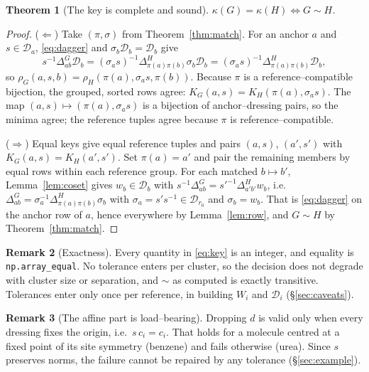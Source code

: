 \documentclass[11pt]{article}
\newtheorem{theorem}{Theorem}
\theoremstyle{definition}
\newtheorem{remark}[theorem]{Remark}
\newcommand{\Dgrp}{\mathcal{D}}
\newcommand{\inv}{^{-1}}
\newcommand{\key}{\kappa}
\begin{document}
\begin{theorem}[The key is complete and sound]\label{thm:key}
$\key(G)=\key(H)\iff G\sim H$.
\end{theorem}

\begin{proof}
($\Leftarrow$) Take $(\pi,\sigma)$ from Theorem~\ref{thm:match}. For an anchor $a$
and $s\in\Dgrp_a$, \eqref{eq:dagger} and $\sigma_b\Dgrp_b=\Dgrp_b$ give
\[
  s\inv\Delta^G_{ab}\Dgrp_b=(\sigma_as)\inv\Delta^H_{\pi(a)\pi(b)}\sigma_b\Dgrp_b
  =(\sigma_as)\inv\Delta^H_{\pi(a)\pi(b)}\Dgrp_b ,
\]
so $\rho_G(a,s,b)=\rho_H(\pi(a),\sigma_as,\pi(b))$. Because $\pi$ is a
reference--compatible bijection, the grouped, sorted rows agree:
$K_G(a,s)=K_H(\pi(a),\sigma_as)$. The map $(a,s)\mapsto(\pi(a),\sigma_as)$ is a
bijection of anchor--dressing pairs, so the minima agree; the reference tuples
agree because $\pi$ is reference--compatible.

($\Rightarrow$) Equal keys give equal reference tuples and pairs $(a,s)$,
$(a',s')$ with $K_G(a,s)=K_H(a',s')$. Set $\pi(a)=a'$ and pair the remaining
members by equal rows within each reference group. For each matched $b\mapsto b'$,
Lemma~\ref{lem:coset} gives $w_b\in\Dgrp_b$ with
$s\inv\Delta^G_{ab}=s'^{-1}\Delta^H_{a'b'}w_b$, i.e.\
$\Delta^G_{ab}=\sigma_a\inv\Delta^H_{\pi(a)\pi(b)}\sigma_b$ with
$\sigma_a=s's\inv\in\Dgrp_{r_0}$ and $\sigma_b=w_b$. That is \eqref{eq:dagger}
on the anchor row of $a$, hence everywhere by Lemma~\ref{lem:row}, and $G\sim H$
by Theorem~\ref{thm:match}.
\end{proof}

\begin{remark}[Exactness]
Every quantity in \eqref{eq:key} is an integer, and equality is
\texttt{np.array\_equal}. No tolerance enters per cluster, so the decision does
not degrade with cluster size or separation, and $\sim$ as computed is exactly
transitive. Tolerances enter only once per reference, in building $W_i$ and
$\Dgrp_i$ (\S\ref{sec:caveats}).
\end{remark}

\begin{remark}[The affine part is load--bearing]\label{rem:centering}
Dropping $d$ is valid only when every dressing fixes the origin, i.e.\
$s\,c_i=c_i$. That holds for a molecule centred at a fixed point of its site
symmetry (benzene) and fails otherwise (urea). Since $s$ preserves norms, the
failure cannot be repaired by any tolerance (\S\ref{sec:example}).
\end{remark}
\end{document}
